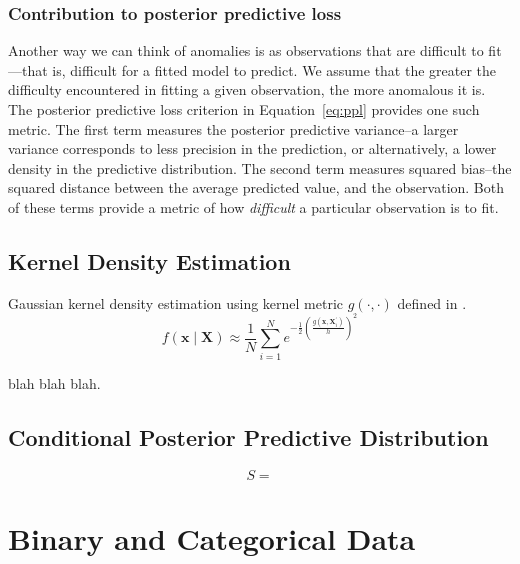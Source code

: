 \subsubsection{Contribution to posterior predictive loss}
Another way we can think of anomalies is as observations that are difficult to 
  fit---that is, difficult for a fitted model to predict.  We assume that the 
  greater the difficulty encountered in fitting a given observation, the more 
  anomalous it is.  The posterior predictive loss criterion in
  Equation~\ref{eq:ppl} provides one such metric.  The first term measures the 
  posterior predictive variance--a larger variance corresponds to less precision 
  in the prediction, or alternatively, a lower density in the predictive 
  distribution.  The second term measures squared bias--the squared distance 
  between the average predicted value, and the observation.  Both of these terms 
  provide a metric of how \emph{difficult} a particular observation is to fit.

\subsection{Kernel Density Estimation}

Gaussian kernel density estimation using kernel metric $g(\cdot,\cdot)$ defined 
  in \cite{trubey:pg}.
  \begin{equation}
    f(\bm{x}\mid \bm{X}) \approx 
      \frac{1}{N}\sum_{i = 1}^N
      e^{-\frac{1}{2}\left(\frac{g(\bm{x},\bm{X}_i^{\prime})}{h}\right)^2}
  \end{equation}

blah blah blah.

\subsection{Conditional Posterior Predictive Distribution}

\begin{equation}
    S = 
\end{equation}
















\section{Binary and Categorical Data}

